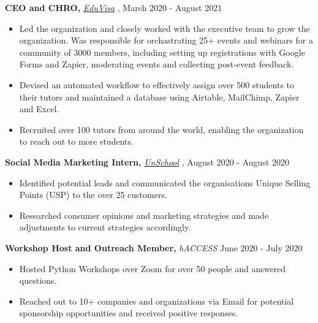\documentclass[a4paper]{article}
\begin{document}
\textbf{CEO and CHRO, }\textit{{\href{https://myeduvisa.org/}{EduVisa}} \faExternalLink},   \hfill March 2020 - August 2021\\
\vspace{-3mm}
\begin{itemize} \itemsep 1pt
    \itemsep-0.05em
	\item Led the organization and closely worked with the executive team to grow the organization. Was responsible for orchastrating 25+ events and webinars for a community of 3000 members, including setting up registrations with Google Forms and Zapier, moderating events and collecting post-event feedback.
	\item Devised an automated workflow to effectively assign over 500 students to their tutors and maintained a database using Airtable, MailChimp, Zapier and Excel.
	\item Recruited over 100 tutors from around the world, enabling the organization to reach out to more students.
\end{itemize}



\textbf{Social Media Marketing Intern, }\textit{{\href{https://www.unschool.in/}{UnSchool}} \faExternalLink},  \hfill August 2020 - August 2020\\
\vspace{-3mm}
\begin{itemize} \itemsep 1pt
    \itemsep-0.05em
	\item Identified potential leads and communicated the organisation\textquotesingle{}s Unique Selling Points (USP) to the over 25 customers.
	\item Researched consumer opinions and marketing strategies and made adjustments to current strategies accordingly.
\end{itemize}

\textbf{Workshop Host and Outreach Member, }\textit{hACCESS}  \hfill June 2020 - July 2020\\
\vspace{-3mm}
\begin{itemize} \itemsep 1pt
    \itemsep-0.05em
	\item Hosted Python Workshops over Zoom for over 50 people and answered questions.
	\item Reached out to 10+ companies and organizations via Email for potential sponsorship opportunities and received positive responses.
\end{itemize}
\end{document}
